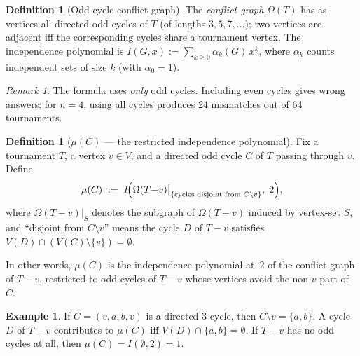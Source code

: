 \documentclass[12pt,reqno]{amsart}
\theoremstyle{plain}
\theoremstyle{definition}
\newtheorem{definition}[theorem]{Definition}
\newtheorem{example}[theorem]{Example}
\theoremstyle{remark}
\newtheorem{remark}[theorem]{Remark}
\begin{document}
\begin{definition}[Odd-cycle conflict graph]\label{def:omega}
The \emph{conflict graph} $\Omega(T)$ has as vertices all directed odd cycles
of $T$ (of lengths $3, 5, 7, \ldots$); two vertices are adjacent iff the
corresponding cycles share a tournament vertex. The independence polynomial is
$I(G,x) := \sum_{k\geq 0} \alpha_k(G)\,x^k$, where $\alpha_k$ counts
independent sets of size $k$ (with $\alpha_0=1$).
\end{definition}

\begin{remark}
The formula uses \emph{only} odd cycles. Including even cycles gives wrong
answers: for $n=4$, using all cycles produces 24 mismatches out of 64
tournaments.
\end{remark}

\begin{definition}[$\mu(C)$ — the restricted independence polynomial]\label{def:mu}
Fix a tournament $T$, a vertex $v \in V$, and a directed odd cycle $C$ of $T$
passing through $v$. Define
\[
  \mu(C) \;:=\; I\!\Bigl(\Omega(T{-}v)\big|_{\{\text{cycles disjoint from }C\setminus v\}},\;2\Bigr),
\]
where $\Omega(T{-}v)|_S$ denotes the subgraph of $\Omega(T{-}v)$ induced by
vertex-set $S$, and ``disjoint from $C\setminus v$'' means the cycle $D$ of
$T{-}v$ satisfies $V(D) \cap (V(C)\setminus\{v\}) = \emptyset$.

In other words, $\mu(C)$ is the independence polynomial at~$2$ of the conflict
graph of $T{-}v$, restricted to odd cycles of $T{-}v$ whose vertices avoid the
non-$v$ part of $C$.
\end{definition}

\begin{example}\label{ex:mu_basic}
If $C = (v, a, b, v)$ is a directed 3-cycle, then $C \setminus v = \{a,b\}$.
A cycle $D$ of $T{-}v$ contributes to $\mu(C)$ iff $V(D) \cap \{a,b\} = \emptyset$.
If $T{-}v$ has no odd cycles at all, then $\mu(C) = I(\emptyset, 2) = 1$.
\end{example}
\end{document}
